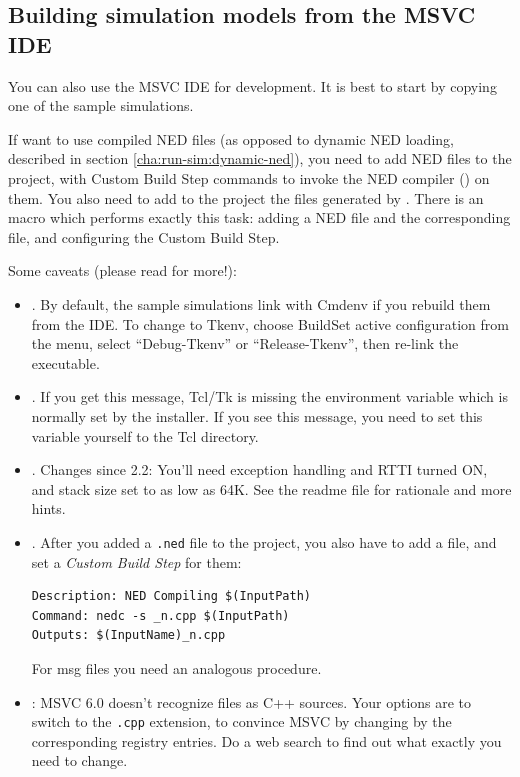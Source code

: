 \subsection{Building simulation models from the MSVC IDE}

You can also use the MSVC IDE for development.
It is best to start by copying one of the sample simulations.

If want to use compiled NED files (as opposed to dynamic
NED loading, described in section \ref{cha:run-sim:dynamic-ned}),
you need to add NED files to the project, with Custom Build Step
commands to invoke the NED compiler () on them.
You also need to add to the project the  files
generated by . There is an 
macro which performs exactly this task: adding a NED file and
the corresponding  file, and configuring
the Custom Build Step.


Some caveats (please read  for more!):

\begin{itemize}
 \item {}. By default,
   the sample simulations link with Cmdenv if you rebuild them
   from the IDE. To change to Tkenv, choose Build{\textbar}Set
   active configuration from the menu, select ``Debug-Tkenv''
   or ``Release-Tkenv'', then re-link the executable.

 \item {}. If you get this message,
   Tcl/Tk is missing the  environment variable
   which is normally set by the installer. If you see this message,
   you need to set this variable yourself to the Tcl  directory.

 \item {}. Changes since {\opp} 2.2:
   You'll need exception handling and RTTI turned ON, and
   stack size set to as low as 64K.
   See the readme file for rationale and more hints.

 \item {}. After you added a \texttt{.ned} file
   to the project, you also have to add a  file, and set a
   \textit{Custom Build Step} for them:

\begin{verbatim}
Description: NED Compiling $(InputPath)
Command: nedc -s _n.cpp $(InputPath)
Outputs: $(InputName)_n.cpp
\end{verbatim}

   For msg files you need an analogous procedure.

 \item {}: MSVC 6.0 doesn't recognize  files
   as C++ sources. Your options are to switch to the \texttt{.cpp} extension,
   to convince MSVC by changing by the corresponding registry entries.
   Do a web search to find out what exactly you need to change.

\end{itemize}


